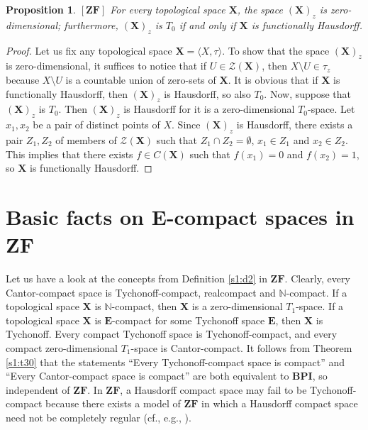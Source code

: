 \documentclass[12pt,twoside,leqno]{article}
\theoremstyle{plain}
\newtheorem{proposition}[theorem]{Proposition}
\theoremstyle{definition}
\theoremstyle{remark}
\begin{document}
\begin{proposition} 
	\label{s3:p9}
	$[\mathbf{ZF}]$ For every topological space  $\mathbf{X}$, the space $(\mathbf{X})_z$ is zero-dimension\-al; furthermore, $(\mathbf{X})_z$ is $T_0$ if and only if $\mathbf{X}$ is functionally Hausdorff.
\end{proposition}
\begin{proof}
	Let us fix any topological space $\mathbf{X}=\langle X, \tau\rangle$. To show that the space $(\mathbf{X})_z$ is zero-dimensional, it suffices to notice that if $U\in\mathcal{Z}(\mathbf{X})$, then $X\setminus U\in\tau_z$ because $X\setminus U$ is a countable union of zero-sets of $\mathbf{X}$. It is obvious that if $\mathbf{X}$ is functionally Hausdorff, then $(\mathbf{X})_z$ is Hausdorff, so also $T_0$. Now, suppose that $(\mathbf{X})_z$ is $T_0$. Then $(\mathbf{X})_z$ is Hausdorff for it is a zero-dimensional $T_0$-space. Let $x_1, x_2$ be a pair of distinct points of $X$. Since $(\mathbf{X})_z$ is Hausdorff, there exists a pair $Z_1,Z_2$ of members of $\mathcal{Z}(\mathbf{X})$ such that $Z_1\cap Z_2=\emptyset$, $x_1\in Z_1$ and $x_2\in Z_2$. This implies that there exists $f\in C(\mathbf{X})$ such that $f(x_1)=0$ and $f(x_2)=1$, so $\mathbf{X}$ is functionally Hausdorff.
\end{proof}

\section{Basic facts on $\mathbf{E}$-compact spaces in $\mathbf{ZF}$}
\label{s4}

Let us have a look at the concepts from Definition \ref{s1:d2} in $\mathbf{ZF}$. Clearly, every Cantor-compact space is Tychonoff-compact, realcompact and $\mathbb{N}$-compact. If a topological space $\mathbf{X}$ is $\mathbb{N}$-compact, then $\mathbf{X}$ is a zero-dimensional $T_1$-space. If a topological space $\mathbf{X}$ is $\mathbf{E}$-compact for some Tychonoff space $\mathbf{E}$, then $\mathbf{X}$ is Tychonoff.  Every compact Tychonoff space is Tychonoff-compact, and every compact zero-dimensional $T_1$-space is Cantor-compact. It follows from Theorem \ref{s1:t30} that the statements ``Every Tychonoff-compact space is compact'' and ``Every Cantor-compact space is compact'' are both equivalent to $\mathbf{BPI}$, so independent of $\mathbf{ZF}$. In $\mathbf{ZF}$, a Hausdorff compact space may fail to be Tychonoff-compact because there exists a model of $\mathbf{ZF}$ in which a Hausdorff compact space need not be completely regular (cf., e.g., \cite{gt}). 
\end{document}

